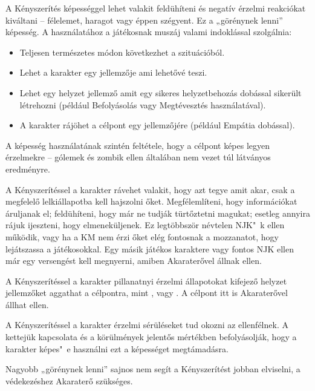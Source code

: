 
A Kényszerítés képességgel lehet valakit feldühíteni és negatív érzelmi reakciókat kiváltani -- félelemet, haragot vagy éppen szégyent. Ez a „görénynek lenni” képesség. A használatához a játékosnak muszáj valami indoklással szolgálnia:
\begin{itemize}
    \item Teljesen természetes módon következhet a szituációból.
    \item Lehet a karakter egy jellemzője ami lehetővé teszi.
    \item Lehet egy helyzet jellemző amit egy sikeres helyzetbehozás dobással sikerült létrehozni (például Befolyásolás vagy Megtévesztés használatával).
    \item A karakter rájöhet a célpont egy jellemzőjére (például Empátia dobással).
\end{itemize}

A képesség használatának szintén feltétele, hogy a célpont képes legyen érzelmekre -- gólemek és zombik ellen általában nem vezet túl látványos eredményre.

\overcome A Kényszerítéssel a karakter rávehet valakit, hogy azt tegye amit akar, csak a megfelelő lelkiállapotba kell hajszolni őket. Megfélemlíteni, hogy információkat áruljanak el; feldühíteni, hogy már ne tudják türtőztetni magukat; esetleg annyira rájuk ijeszteni, hogy elmeneküljenek. Ez legtöbbször névtelen NJK"~k ellen működik, vagy ha a KM nem érzi őket elég fontosnak a mozzanatot, hogy lejátszassa a játékosokkal. Egy másik játékos karaktere vagy fontos NJK ellen már egy versengést kell megnyerni, amiben Akaraterővel állnak ellen.

\advantage A Kényszerítéssel a karakter pillanatnyi érzelmi állapotokat kifejező helyzet jellemzőket aggathat a célpontra, mint ,  vagy . A célpont itt is Akaraterővel állhat ellen.

\attack A Kényszerítéssel a karakter érzelmi sérüléseket tud okozni az ellenfélnek. A kettejük kapcsolata és a körülmények jelentős mértékben befolyásolják, hogy a karakter képes"~e használni ezt a képességet megtámadásra.

 Nagyobb „görénynek lenni” sajnos nem segít a Kényszerítést jobban elviselni, a védekezéshez Akaraterő szükséges.


